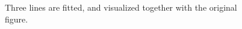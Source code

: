 \documentclass[sn-mathphys-num]{sn-jnl}%
\begin{document}
\begin{figure}[h]
    \caption{Three lines are fitted, and visualized together with the original figure.}
    \label{fig:fittedLines}
\end{figure}

\end{document}
